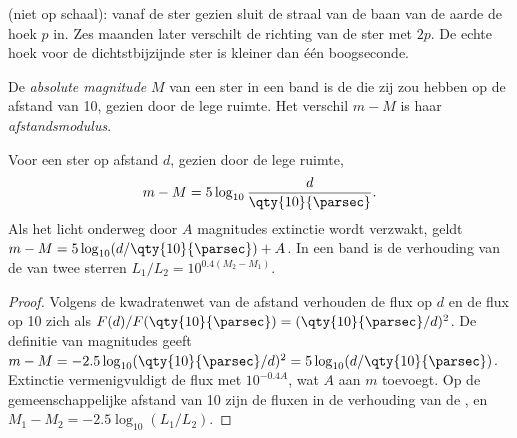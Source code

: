 \begin{omfigure}

{\small {} (niet op schaal): vanaf de ster gezien sluit de
straal van de baan van de aarde de hoek $p$ in. Zes maanden later verschilt de richting van
de ster met $2p$. De echte hoek voor de dichtstbijzijnde ster is kleiner dan één boogseconde.}
\end{omfigure}

\begin{definition}\label{def:b1:observing-the-sky:absolute}
De \emph{absolute magnitude} $M$ van een ster in een band is de
 die zij zou hebben op de afstand van \qty{10}{\parsec}, gezien door de
lege ruimte. Het verschil $m - M$ is haar \emph{afstandsmodulus}.
\end{definition}

\begin{proposition}[De afstandsmodulus]\label{prop:b1:observing-the-sky:modulus}
Voor een ster op afstand $d$, gezien door de lege ruimte,
\[
  m - M = 5\log_{10}\frac{d}{\qty{10}{\parsec}} .
\]
Als het licht onderweg door $A$ magnitudes extinctie wordt verzwakt, geldt
$m - M = 5\log_{10}(d/\qty{10}{\parsec}) + A$. In een band is de verhouding van de
 van twee sterren $L_1/L_2 = 10^{0.4(M_2 - M_1)}$.
\end{proposition}

\begin{proof}
Volgens de kwadratenwet van de afstand verhouden de flux op $d$ en de flux op
\qty{10}{\parsec} zich als $F(d)/F(\qty{10}{\parsec}) = (\qty{10}{\parsec}/d)^2$. De
definitie van magnitudes geeft $m - M = -2.5\log_{10}(\qty{10}{\parsec}/d)^2
= 5\log_{10}(d/\qty{10}{\parsec})$. Extinctie vermenigvuldigt de flux met
$10^{-0.4A}$, wat $A$ aan $m$ toevoegt. Op de gemeenschappelijke afstand van
\qty{10}{\parsec} zijn de fluxen in de verhouding van de , en
$M_1 - M_2 = -2.5\log_{10}(L_1/L_2)$.
\end{proof}

